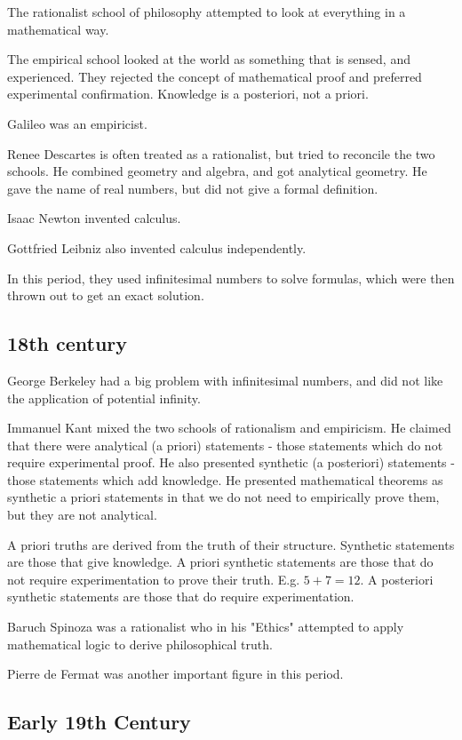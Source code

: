 \documentclass{idc_msc}
\begin{document}
The rationalist school of philosophy attempted to look at everything in a mathematical way.

The empirical school looked at the world as something that is sensed, and experienced.
They rejected the concept of mathematical proof and preferred experimental confirmation.
Knowledge is a posteriori, not a priori.

Galileo was an empiricist.

Renee Descartes is often treated as a rationalist, but tried to reconcile the two schools.
He combined geometry and algebra, and got analytical geometry.
He gave the name of real numbers, but did not give a formal definition.

Isaac Newton invented calculus.

Gottfried Leibniz also invented calculus independently.

In this period, they used infinitesimal numbers to solve formulas, which were then thrown out to get an exact solution.

\subsection{18th century}

George Berkeley had a big problem with infinitesimal numbers, and did not like the application of potential infinity.

Immanuel Kant mixed the two schools of rationalism and empiricism.
He claimed that there were analytical (a priori) statements - those statements which do not require experimental proof.
He also presented synthetic (a posteriori) statements - those statements which add knowledge.
He presented mathematical theorems as synthetic a priori statements in that we do not need to empirically prove them, but they are not analytical.

A priori truths are derived from the truth of their structure.
Synthetic statements are those that give knowledge.
A priori synthetic statements are those that do not require experimentation to prove their truth. E.g. \(5 + 7 = 12\).
A posteriori synthetic statements are those that do require experimentation.

Baruch Spinoza was a rationalist who in his "Ethics" attempted to apply mathematical logic to derive philosophical truth.

Pierre de Fermat was another important figure in this period.

\subsection{Early 19th Century}
\end{document}
